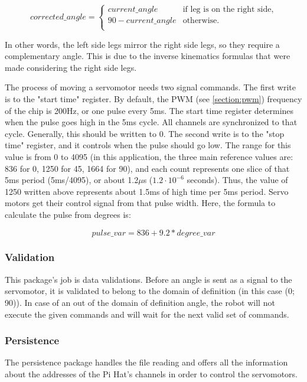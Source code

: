 \documentclass[runningheads,a4paper,12pt]{report}
\begin{document}
\begin{equation*}
    corrected\_angle = \begin{cases}
               current\_angle  & \text{if leg is on the right side,}\\
               90 - current\_angle  & \text{otherwise.}\\
               \end{cases}
\end{equation*}

In other words, the left side legs mirror the right side legs, so they require a complementary angle. This is due to the inverse kinematics formulas that were made considering the right side legs. 

The process of moving a servomotor needs two signal commands. The first write is to the "start time" register. By default, the PWM (see \ref{section:pwm}) frequency of the chip is 200Hz, or one pulse every 5ms. The start time register determines when the pulse goes high in the 5ms cycle. All channels are synchronized to that cycle. Generally, this should be written to 0. The second write is to the "stop time" register, and it controls when the pulse should go low. The range for this value is from 0 to 4095 (in this application, the three main reference values are: 836 for 0\textdegree, 1250 for 45\textdegree, 1664 for 90\textdegree), and each count represents one slice of that 5ms period (5ms/4095), or about 1.2$\mu$s ($1.2 \cdot 10^{-6}$ seconds). Thus, the value of 1250 written above represents about 1.5ms of high time per 5ms period. Servo motors get their control signal from that pulse width. Here, the formula to calculate the pulse from degrees is: 

\[pulse\_var = 836 + 9.2 * degree\_var\]

\subsubsection{Validation}
This package's job is data validations. Before an angle is sent as a signal to the servomotor, it is validated to belong to the domain of definition (in this case (0\textdegree; 90\textdegree)). In case of an out of the domain of definition angle, the robot will not execute the given commands and will wait for the next valid set of commands.

\subsubsection{Persistence}
The persistence package handles the file reading and offers all the information about the addresses of the Pi Hat's channels in order to control the servomotors. 
\end{document}
